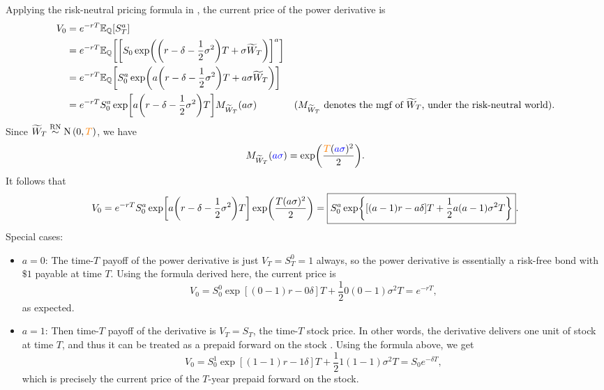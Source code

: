 \begin{enumerate}
Applying the risk-neutral pricing formula in ,
the current price of the power derivative is
\begin{align*}
V_0&=e^{-rT}\mathbb{E}_{\mathbb{Q}}\qty[S_T^{a}] \\
&=e^{-rT}\mathbb{E}_{\mathbb{Q}}\qty[\qty[S_0\exp(\qty(r-\delta-\frac{1}{2}\sigma^2)T+\sigma\widetilde{W}_T)]^{a}] \\
&=e^{-rT}\mathbb{E}_{\mathbb{Q}}\qty[S_0^{a}\exp(a\qty(r-\delta-\frac{1}{2}\sigma^2)T+a\sigma\widetilde{W}_T)] \\
&=e^{-rT}S_0^{a}\exp[a\qty(r-\delta-\frac{1}{2}\sigma^2)T]M_{\widetilde{W}_T}(a\sigma)&\text{(\(M_{\widetilde{W}_T}\)
denotes the mgf of \(\widetilde{W}_T\), under the risk-neutral world)}.
\end{align*}
Since \(\widetilde{W}_T\overset{\mathrm{RN}}{\sim}\operatorname{N}\qty(0,{\color{orange}T})\), we have
\[
M_{\widetilde{W}_T}({\color{blue}a\sigma})
=\exp(\frac{{\color{orange}T}({\color{blue}a\sigma})^{2}}{2}).
\]
It follows that
\[
V_0=e^{-rT}S_0^{a}\exp[a\qty(r-\delta-\frac{1}{2}\sigma^2)T]\exp(\frac{T(a\sigma)^{2}}{2})
=\boxed{S_0^{a}\exp{[(a-1)r-a\delta]T+\frac{1}{2}a(a-1)\sigma^2T}}.
\]
Special cases:
\begin{itemize}
\item \(a=0\): The time-\(T\) payoff of the power derivative is just
\(V_T=S_T^{0}=1\) always, so the power derivative is essentially a risk-free
bond with \(\$1\) payable at time \(T\). Using the formula derived here, the
current price is
\[
V_0=S_0^{0}\exp{[(0-1)r-0\delta]T+\frac{1}{2}0(0-1)\sigma^2T}
=e^{-rT},
\]
as expected.
\item \(a=1\): Then time-\(T\) payoff of the derivative is \(V_T=S_T\), the
time-\(T\) stock price. In other words, the derivative delivers one unit of
stock  at time \(T\), and thus it can be treated as a prepaid
forward on the stock . Using the formula above, we get
\[
V_0=S_0^{1}\exp{[(1-1)r-1\delta]T+\frac{1}{2}1(1-1)\sigma^2T}
=S_0e^{-\delta T},
\]
which is precisely the current price of the \(T\)-year prepaid forward on the
stock.
\end{itemize}
\end{enumerate}

